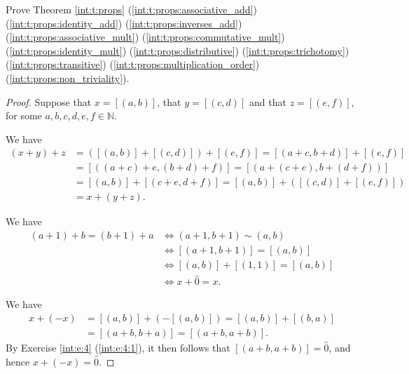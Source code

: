 \Newpage
\begin{exercise} %
	Prove Theorem \ref{int:t:props} (\ref{int:t:props:associative_add}) (\ref{int:t:props:identity_add}) (\ref{int:t:props:inverses_add}) (\ref{int:t:props:associative_mult}) (\ref{int:t:props:commutative_mult}) (\ref{int:t:props:identity_mult}) (\ref{int:t:props:distributive}) (\ref{int:t:props:trichotomy}) (\ref{int:t:props:transitive}) (\ref{int:t:props:multiplication_order}) (\ref{int:t:props:non_triviality}).
\end{exercise}

\begin{proof}
	Suppose that $x = [(a, b)]$, that $y = [(c, d)]$ and that $z = [(e, f)]$, for some $a, b, c, d, e, f \in \mathbb{N}$.

	We have
	\begin{align*}
		(x + y) + z & = ([(a, b)] + [(c, d)]) + [(e, f)] = [(a + c, b + d)] + [(e, f)] \\
		            & = [((a + c) + e, (b + d) + f)] = [(a + (c + e), b + (d + f))]    \\
		            & = [(a, b)] + [(c + e, d + f)] = [(a, b)] + ([(c, d)] + [(e, f)]) \\
		            & = x + (y + z).
	\end{align*}

	We have
	\begin{align*}
		(a + 1) + b = (b + 1) + a & \iff (a + 1, b + 1)      \sim (a, b) \\
		                          & \iff [(a + 1, b + 1)]    = [(a, b)]  \\
		                          & \iff [(a, b)] + [(1, 1)] = [(a, b)]  \\
		                          & \iff x + \hat{0}         = x.
	\end{align*}

	We have
	\begin{align*}
		x + (-x) & = [(a, b)] + (-[(a, b)]) = [(a, b)] + [(b, a)] \\
		         & = [(a + b, b + a)] = [(a + b, a + b)].
	\end{align*}
	By Exercise \ref{int:e:4} (\ref{int:e:4:1}), it then follows that $[(a + b, a + b)] = \hat{0}$, and hence $x + (-x) = \hat{0}$.


\end{proof}
